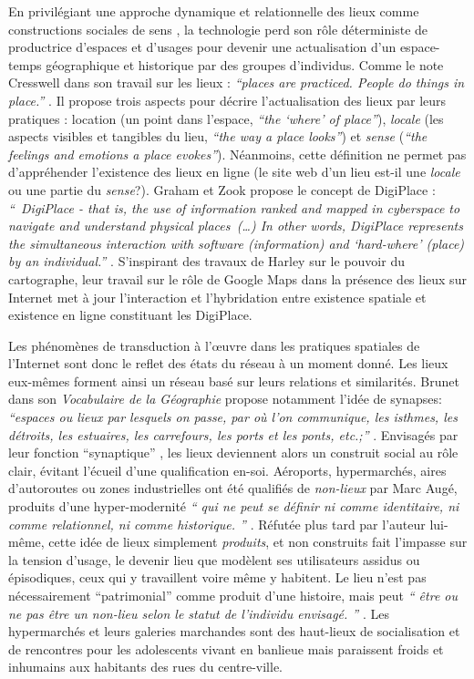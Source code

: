 En privilégiant une approche dynamique et relationnelle des lieux comme constructions sociales de sens \citep{Kyle2007}, la technologie perd son rôle déterministe de productrice d’espaces et d’usages pour devenir une actualisation d’un espace-temps géographique et historique par des groupes d’individus. Comme le note Cresswell dans son travail sur les lieux : \textit{“places are practiced. People do things in place.”} \citep{Cresswell2004}. Il propose trois aspects pour décrire l’actualisation des lieux par leurs pratiques : location (un point dans l’espace, \textit{“the ‘where’ of place”}), \textit{locale} (les aspects visibles et tangibles du lieu, \textit{“the way a place looks”}) et \textit{sense} (\textit{“the feelings and emotions a place evokes”}). Néanmoins, cette définition ne permet pas d’appréhender l’existence des lieux en ligne (le site web d’un lieu est-il une \textit{locale} ou une partie du \textit{sense}?). Graham et Zook propose le concept de DigiPlace : \textit{`` DigiPlace - that is, the use of information ranked and mapped in cyberspace to navigate and understand physical places (…) In other words, DigiPlace represents the simultaneous interaction with software (information) and `hard-where' (place) by an individual.''} \citep{Zook2007}. S’inspirant des travaux de Harley sur le pouvoir du cartographe, leur travail sur le rôle de Google Maps dans la présence des lieux sur Internet met à jour l’interaction et l’hybridation entre existence spatiale et existence en ligne constituant les DigiPlace. 

Les phénomènes de transduction à l’œuvre dans les pratiques spatiales de l’Internet sont donc le reflet des états du réseau à un moment donné. Les lieux eux-mêmes forment ainsi un réseau basé sur leurs relations et similarités. Brunet dans son \textit{Vocabulaire de la Géographie} propose notamment l’idée de synapses: \textit{``espaces ou lieux par lesquels on passe, par où l'on communique, les isthmes, les détroits, les estuaires, les carrefours, les ports et les ponts, etc.;''} \citep{Brunet1972}. Envisagés par leur fonction ``synaptique'' , les lieux deviennent alors un construit social au rôle clair, évitant l’écueil d’une qualification en-soi. Aéroports, hypermarchés, aires d’autoroutes ou zones industrielles ont été qualifiés de \textit{non-lieux} par Marc Augé, produits d’une  hyper-modernité \textit{`` qui ne peut se définir ni comme identitaire, ni comme relationnel, ni comme historique. ''} \citep{Auge1995}. Réfutée plus tard par l’auteur lui-même, cette idée de lieux simplement \textit{produits}, et non construits fait l’impasse sur la tension d’usage, le devenir lieu que modèlent ses utilisateurs assidus ou épisodiques, ceux qui y travaillent voire même y habitent. Le lieu n’est pas nécessairement “patrimonial” comme produit d’une histoire, mais peut \textit{`` être ou ne pas être un non-lieu selon le statut de l'individu envisagé. ''} \citep{Debarbieux1993}. Les hypermarchés et leurs galeries marchandes sont des haut-lieux de socialisation et de rencontres pour les adolescents vivant en banlieue \citep{Matthews2000} mais paraissent froids et inhumains aux habitants des rues du centre-ville.


